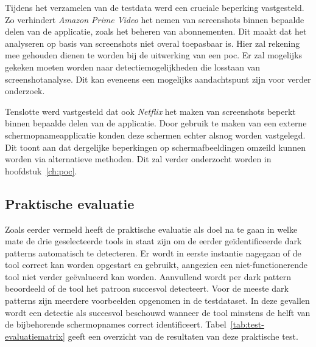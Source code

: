 \vspace{1em}

Tijdens het verzamelen van de testdata werd een cruciale beperking vastgesteld. Zo verhindert \textit{Amazon Prime Video} het nemen van screenshots binnen bepaalde delen van de applicatie, zoals het beheren van abonnementen. Dit maakt dat het analyseren op basis van screenshots niet overal toepasbaar is. Hier zal rekening mee gehouden dienen te worden bij de uitwerking van een \acrshort{poc}. Er zal mogelijks gekeken moeten worden naar detectiemogelijkheden die losstaan van screenshotanalyse. Dit kan eveneens een mogelijks aandachtspunt zijn voor verder onderzoek.

\vspace{1em}

Tenslotte werd vastgesteld dat ook \textit{Netflix} het maken van screenshots beperkt binnen bepaalde delen van de applicatie. Door gebruik te maken van een externe schermopnameapplicatie konden deze schermen echter alsnog worden vastgelegd. Dit toont aan dat dergelijke beperkingen op schermafbeeldingen omzeild kunnen worden via alternatieve methoden. Dit zal verder onderzocht worden in hoofdstuk~\ref{ch:poc}.

\vspace{1em}

\subsection{Praktische evaluatie}
\label{subsec:praktijkevaluatie}

\vspace{1em}

Zoals eerder vermeld heeft de praktische evaluatie als doel na te gaan in welke mate de drie geselecteerde tools in staat zijn om de eerder geïdentificeerde dark patterns automatisch te detecteren. Er wordt in eerste instantie nagegaan of de tool correct kan worden opgestart en gebruikt, aangezien een niet-functionerende tool niet verder geëvalueerd kan worden. Aanvullend wordt per dark pattern beoordeeld of de tool het patroon succesvol detecteert. Voor de meeste dark patterns zijn meerdere voorbeelden opgenomen in de testdataset. In deze gevallen wordt een detectie als succesvol beschouwd wanneer de tool minstens de helft van de bijbehorende schermopnames correct identificeert. Tabel~\ref{tab:test-evaluatiematrix} geeft een overzicht van de resultaten van deze praktische test.

